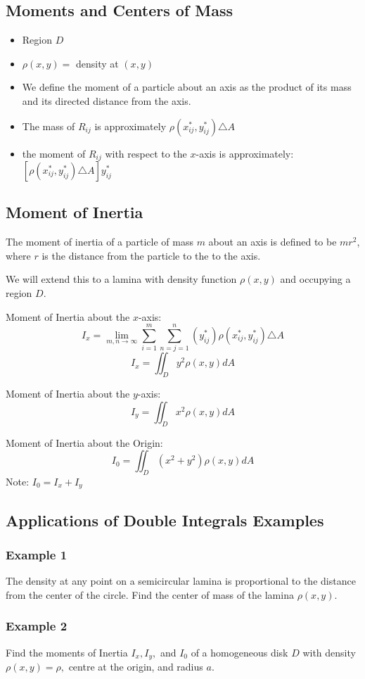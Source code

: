 \documentclass[12pt]{article}
\begin{document}
\subsection{Moments and Centers of Mass}
\begin{itemize}
	\item Region \(D\) 
	\item \(\rho (x,y) = \) density at \((x,y)\)
	\item We define the moment of a particle about an axis as the product of its mass and its directed distance from the axis.
	\item The mass of \(R_{ij} \) is approximately \(\rho(x^{*}_{ij}, y^{*}_{ij}) \triangle A\)
	\item the moment of \(R_{ij}\) with respect to the \(x\)-axis is approximately:  \\
		\([\rho(x^{*}_{ij}, y^{*}_{ij})\triangle A] y^{*}_{ij}\)
\end{itemize}

\subsection{Moment of Inertia}
The moment of inertia of a particle of mass \(m\) about an axis is defined to be  \(mr^2\), where \(r\) is the distance from the particle to the to the axis.

We will extend this to a lamina with density function \(\rho(x,y)\) and occupying a region \(D\).

Moment of Inertia about the \(x\)-axis:
\[
	I_x = \lim_{m,n \to \infty} \sum_{i=1}^{m} \sum_{n=j = 1}^{n} (y^{*}_{ij})\rho(x^{*}_{ij},y^{*}_{ij})\triangle A
\]
\[
	I_x = \iint_{D}y^2 \rho(x,y) dA
\]

Moment of Inertia about the \(y\)-axis:
\[
	I_y = \iint_{D}x^2\rho(x,y)dA
\]

Moment of Inertia about the Origin:
\[
	I_0 = \iint_{D}(x^2 + y^{2})\rho(x,y)dA
\]
Note: \(I_0 = I_x + I_y\)
\subsection{Applications of Double Integrals Examples}
\subsubsection{Example 1}
The density at any point on a semicircular lamina is proportional to the distance from the center of the circle. Find the center of mass of the lamina \(\rho(x,y)\).

\subsubsection{Example 2}
Find the moments of Inertia \(I_x, I_y,\) and \(I_0\) of a homogeneous disk \(D\) with density \(\rho(x,y) = \rho ,\) centre at the origin, and radius \(a\).
\end{document}
